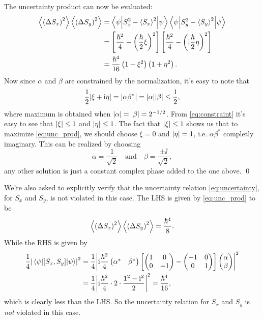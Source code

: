 \documentclass[11pt,letter, swedish, english
]{article}
\begin{document}
The uncertainty product can now be evaluated:
\begin{equation} \label{eq:unc_prod}
\begin{aligned}
\ev{\left(\Delta{S_x}\right)^2}\ev{\left(\Delta{S_y}\right)^2}
&= \ev**{S_x^2-\ev{S_x}^2}{\psi}\ev**{S_y^2-\ev{S_y}^2}{\psi} \\
&= \left[\frac{\hbar^2}{4}-\left(\frac{\hbar}{2}\xi\right)^2\right]
   \left[\frac{\hbar^2}{4}-\left(\ii\frac{\hbar}{2}\eta\right)^2\right]\\
&= \frac{\hbar^4}{16}\left(1 - \xi^2\right)\left(1 + \eta^2\right).
\end{aligned}
\end{equation}
Now since $\alpha$ and $\beta$ are constrained by the normalization,
it's easy to note that
\begin{equation} \label{eq:constraint}
\frac{1}{2}\abs{\xi+\mathrm{i}\eta} = \abs{\alpha\beta^*}=\abs{\alpha}\abs{\beta}\le\frac{1}{2},
\end{equation}
where maximum is obtained when $\abs{\alpha}=\abs{\beta}=2^{-1/2}$.
From \eqref{eq:constraint} it's easy to see that $\abs{\xi}\le1$ and
$\abs{\eta}\le1$. The fact that $\abs{\xi}\le1$ shows us that to
maximize \eqref{eq:unc_prod}, we should choose $\xi=0$ and
$\abs{\eta}=1$, i.e. $\alpha\beta^*$ completly imaginary. This can be
realized by choosing 
\begin{equation}
\alpha=\frac{1}{\sqrt{2}}\quad\text{and}\quad\beta=\frac{\pm\ii}{\sqrt{2}},
\end{equation}
any other solution is just a constant complex phase added to the one
above. \qed

We're also asked to explicitly verify that the uncertainty relation
\eqref{eq:uncertainty}, for $S_x$ and $S_y$, is not violated in this
case. The LHS is given by \eqref{eq:unc_prod} to be
\begin{equation}
\ev{\left(\Delta{S_x}\right)^2}\ev{\left(\Delta{S_y}\right)^2}
= \frac{\hbar^4}{8}.
\end{equation}
While the RHS is given by
\begin{equation}
\begin{aligned}
\frac{1}{4}\abs{\ev{\comm{S_x}{S_y}}{\psi}}^2
&= \frac{1}{4} \abs{
   \ii\frac{\hbar^2}{4}
   \begin{pmatrix}\alpha^*&\beta^*\end{pmatrix}
   \left[
     \begin{pmatrix}1&0\\0&-1\end{pmatrix}-\begin{pmatrix}-1&0\\0&1\end{pmatrix}
   \right]
   \begin{pmatrix}\alpha\\\beta\end{pmatrix}
 }^2\\
&= \frac{1}{4} \abs{
   \ii\frac{\hbar^2}{4}\cdot2\cdot\frac{1^2-\ii^2}{2}
 }^2= \frac{\hbar^4}{16},
\end{aligned}
\end{equation}
which is clearly less than the LHS. So the uncertainty relation for
$S_x$ and $S_y$ is \emph{not} violated in this case.
\end{document}
